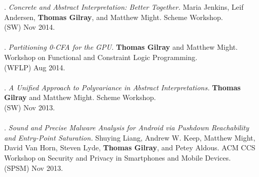 \paper. \textit{Concrete and Abstract Interpretation: Better Together.}
Maria Jenkins, Leif Andersen, \textbf{Thomas Gilray}, and Matthew Might.
Scheme Workshop.
\\(SW) Nov 2014. 
\\ \vspace{-0.1cm}\\
\paper. \textit{Partitioning 0-CFA for the GPU.}
\textbf{Thomas Gilray} and Matthew Might.
Workshop on Functional and Constraint Logic Programming.
\\(WFLP) Aug 2014. 
\\ \vspace{-0.1cm}\\
\paper. \textit{A Unified Approach to Polyvariance in Abstract Interpretations.}
\textbf{Thomas Gilray} and Matthew Might.
Scheme Workshop.
\\(SW) Nov 2013. 
\\ \vspace{-0.1cm}\\
\paper. \textit{Sound and Precise Malware Analysis for Android via Pushdown Reachability and Entry-Point Saturation.}
Shuying Liang, Andrew W. Keep, Matthew Might, David Van Horn, Steven Lyde, \textbf{Thomas Gilray}, and Petey Aldous.
ACM CCS Workshop on Security and Privacy in Smartphones and Mobile Devices.
\\(SPSM) Nov 2013. 
\\ \vspace{-0.1cm}\\
